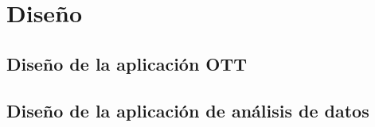 \chapter{Diseño}
\label{chap:Diseño}



\section{Diseño de la aplicación OTT}
\label{sec:diseno_ott}





\section{Diseño de la aplicación de análisis de datos}
\label{sec:diseno_datos}


